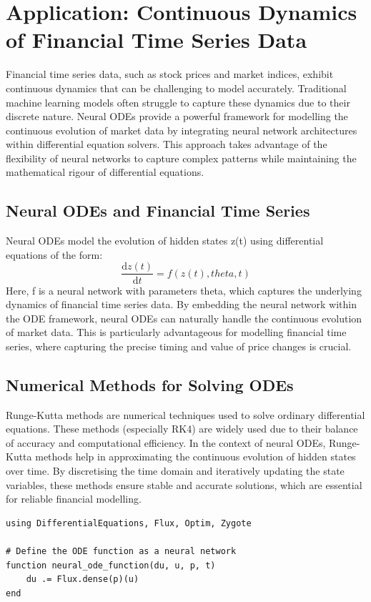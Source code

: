 \documentclass[a4paper,11pt,titlepage]{article}
\def\({}%
\def\){}%
\def\theta{theta}%
\theoremstyle{definition}
\theoremstyle{plain}
\theoremstyle{remark}
\begin{document}
\pagebreak
\section{Application: Continuous Dynamics of Financial Time Series Data}

Financial time series data, such as stock prices and market indices, exhibit continuous dynamics that can be challenging to model accurately. Traditional machine learning models often struggle to capture these dynamics due to their discrete nature. Neural ODEs provide a powerful framework for modelling the continuous evolution of market data by integrating neural network architectures within differential equation solvers. This approach takes advantage of the flexibility of neural networks to capture complex patterns while maintaining the mathematical rigour of differential equations.

\subsection{Neural ODEs and Financial Time Series}

Neural ODEs model the evolution of hidden states \(z(t)\) using differential equations of the form:
\[
\frac{\mathrm{d}z(t)}{\mathrm{d}t} = f(z(t), \theta, t)
\]
Here, \(f\) is a neural network with parameters \(\theta\), which captures the underlying dynamics of financial time series data. By embedding the neural network within the ODE framework, neural ODEs can naturally handle the continuous evolution of market data. This is particularly advantageous for modelling financial time series, where capturing the precise timing and value of price changes is crucial.

\subsection{Numerical Methods for Solving ODEs}

Runge-Kutta methods are numerical techniques used to solve ordinary differential equations. These methods (especially RK4) are widely used due to their balance of accuracy and computational efficiency. In the context of neural ODEs, Runge-Kutta methods help in approximating the continuous evolution of hidden states over time. By discretising the time domain and iteratively updating the state variables, these methods ensure stable and accurate solutions, which are essential for reliable financial modelling.

\begin{verbatim}
using DifferentialEquations, Flux, Optim, Zygote

# Define the ODE function as a neural network
function neural_ode_function(du, u, p, t)
    du .= Flux.dense(p)(u)
end
\end{verbatim}
\end{document}
